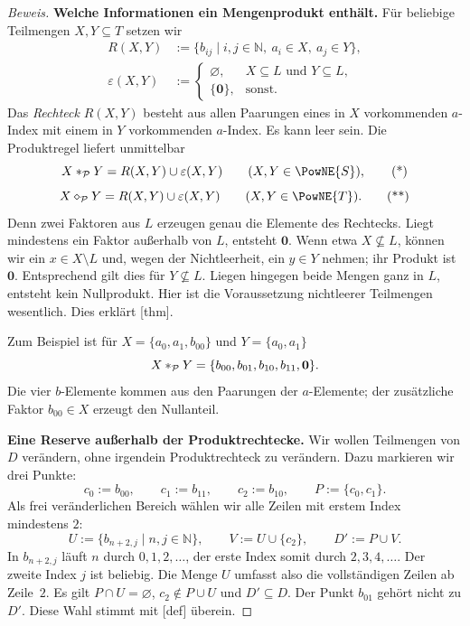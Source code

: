 \begin{proof}[Beweis]
\medskip\noindent
\textbf{Welche Informationen ein Mengenprodukt enthält.}
Für beliebige Teilmengen \(X,Y\subseteq T\) setzen wir
\[
  \begin{aligned}
    R(X,Y)&:=\{b_{ij}\mid i,j\in\mathbb N,
                            \ a_i\in X,\ a_j\in Y\},\\
    \varepsilon(X,Y)&:=
      \begin{cases}
        \varnothing,&X\subseteq L\text{ und }Y\subseteq L,\\
        \{\mathbf0\},&\text{sonst}.
      \end{cases}
  \end{aligned}
\]
Das \emph{Rechteck} \(R(X,Y)\) besteht aus allen Paarungen eines in
\(X\) vorkommenden \(a\)-Index mit einem in \(Y\) vorkommenden
\(a\)-Index. Es kann leer sein. Die Produktregel liefert unmittelbar
\begin{equation}
  X\MogStar_{\mathcal P}Y
    =R(X,Y)\cup\varepsilon(X,Y)
    \qquad(X,Y\in\PowNE{S}),
  \tag{*}\label{mog-reading-product-S}
\end{equation}
\begin{equation}
  X\MogDiamond_{\mathcal P}Y
    =R(X,Y)\cup\varepsilon(X,Y)
    \qquad(X,Y\in\PowNE{T}).
  \tag{**}\label{mog-reading-product-T}
\end{equation}
Denn zwei Faktoren aus \(L\) erzeugen genau die Elemente des
Rechtecks. Liegt mindestens ein Faktor außerhalb von \(L\), entsteht
\(\mathbf0\). Wenn etwa \(X\not\subseteq L\), können wir ein
\(x\in X\setminus L\) und, wegen der Nichtleerheit, ein \(y\in Y\)
nehmen; ihr Produkt ist \(\mathbf0\). Entsprechend gilt dies für
\(Y\not\subseteq L\). Liegen hingegen beide Mengen ganz in \(L\),
entsteht kein Nullprodukt. Hier ist die Voraussetzung nichtleerer
Teilmengen wesentlich. Dies erklärt
[thm].

Zum Beispiel ist für \(X=\{a_0,a_1,b_{00}\}\) und
\(Y=\{a_0,a_1\}\)
\[
  X\mathbin{\ast}_{\mathcal P}Y
    =\{b_{00},b_{01},b_{10},b_{11},\mathbf0\}.
\]
Die vier \(b\)-Elemente kommen aus den Paarungen der
\(a\)-Elemente; der zusätzliche Faktor \(b_{00}\in X\)
erzeugt den Nullanteil.

\medskip\noindent
\textbf{Eine Reserve außerhalb der Produktrechtecke.}
Wir wollen Teilmengen von \(D\) verändern, ohne irgendein
Produktrechteck zu verändern. Dazu markieren wir drei Punkte:
\[
  c_0:=b_{00},\qquad c_1:=b_{11},\qquad c_2:=b_{10},
  \qquad P:=\{c_0,c_1\}.
\]
Als frei veränderlichen Bereich wählen wir alle Zeilen mit erstem
Index mindestens \(2\):
\[
  U:=\{b_{n+2,j}\mid n,j\in\mathbb N\},
  \qquad V:=U\cup\{c_2\},\qquad D':=P\cup V.
\]
In \(b_{n+2,j}\) läuft \(n\) durch \(0,1,2,\ldots\), der erste
Index somit durch \(2,3,4,\ldots\). Der zweite Index \(j\) ist
beliebig. Die Menge \(U\) umfasst also die vollständigen Zeilen ab
Zeile~\(2\). Es gilt
\(P\cap U=\varnothing\), \(c_2\notin P\cup U\) und
\(D'\subseteq D\). Der Punkt \(b_{01}\) gehört nicht zu \(D'\).
Diese Wahl stimmt mit
[def] überein.


\end{proof}
